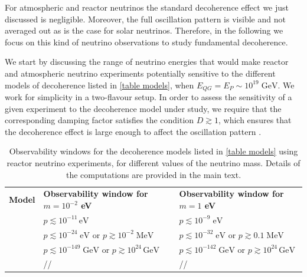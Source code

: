 \documentclass[11pt]{article}
\begin{document}
For atmospheric and reactor neutrinos the standard decoherence effect we just discussed is negligible. Moreover, the full oscillation pattern is visible and not averaged out as is the case for solar neutrinos. Therefore, in the following we focus on this kind of neutrino observations to study fundamental decoherence. 

We start by discussing the range of neutrino energies that would make  reactor and atmospheric neutrino experiments potentially sensitive to the different models of decoherence listed in \cref{table models}, when $E_{QG}=E_P\sim 10^{19}\;\text{GeV}$. We work for simplicity in a two-flavour setup. In order to assess the sensitivity of a given experiment to the decoherence model under study, we require that  the corresponding damping factor satisfies the condition $D\gtrsim 1$, which ensures that the decoherence effect is large enough to affect the oscillation pattern \cite{Christian:2005qa}.


\begin{table}
    \centering
{\tabulinesep=1.2mm
        \begin{tabu}{|l|l|l|}
       {\small\bf{Model}} & {\footnotesize \bf{Observability window for $m=10^{-2}$ eV}} &{\footnotesize \bf{Observability window for $m=1$ eV}} \\ 
       {\small  \cite{Arzano:2022nlo}} & $p\lesssim 10^{-11}\,\text{eV}$ & $p\lesssim 10^{-9}\; \text{eV}$\\ 
           {\small  \cite{Breuer:2008rh}} &  $p\lesssim 10^{-24}\;\text{eV}$ or $p \gtrsim 10^{-2} \; \text{MeV}$ & $p\lesssim 10^{-32}\;\text{eV}$ or $p \gtrsim 0.1 \; \text{MeV}$\\ 
        {\small  \cite{Petruzziello:2020wkd}} & $p\lesssim 10^{-149}\;\text{GeV}$ or $p\gtrsim 10^{24}\,\text{GeV}$ & $p\lesssim 10^{-142}\;\text{GeV}$ or $p\gtrsim 10^{24}\,\text{GeV}$\\ 
        {\small  \cite{Blencowe:2012mp}} &  // & // \\  
        \end{tabu}}
    \caption{Observability windows for the decoherence models listed in \cref{table models} using reactor neutrino experiments, for different values of the neutrino mass. Details of the computations are provided in the main text.}
    \label{table results}
\end{table}
\end{document}
